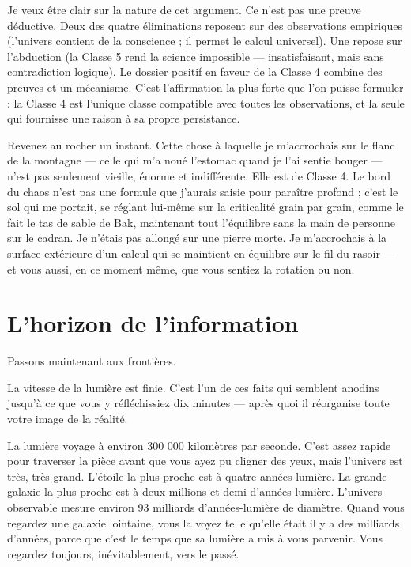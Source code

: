 \documentclass[11pt, twoside, openright]{book}
\begin{document}
Je veux être clair sur la nature de cet argument. Ce n'est pas une preuve déductive. Deux des quatre éliminations reposent sur des observations empiriques (l'univers contient de la conscience ; il permet le calcul universel). Une repose sur l'abduction (la Classe 5 rend la science impossible --- insatisfaisant, mais sans contradiction logique). Le dossier positif en faveur de la Classe 4 combine des preuves et un mécanisme. C'est l'affirmation la plus forte que l'on puisse formuler : la Classe 4 est l'unique classe compatible avec toutes les observations, et la seule qui fournisse une raison à sa propre persistance.

Revenez au rocher un instant. Cette chose à laquelle je m'accrochais sur le flanc de la montagne --- celle qui m'a noué l'estomac quand je l'ai sentie bouger --- n'est pas seulement vieille, énorme et indifférente. Elle est de Classe 4. Le bord du chaos n'est pas une formule que j'aurais saisie pour paraître profond ; c'est le sol qui me portait, se réglant lui-même sur la criticalité grain par grain, comme le fait le tas de sable de Bak, maintenant tout l'équilibre sans la main de personne sur le cadran. Je n'étais pas allongé sur une pierre morte. Je m'accrochais à la surface extérieure d'un calcul qui se maintient en équilibre sur le fil du rasoir --- et vous aussi, en ce moment même, que vous sentiez la rotation ou non.


\section*{L'horizon de l'information}

Passons maintenant aux frontières.

La vitesse de la lumière est finie. C'est l'un de ces faits qui semblent anodins jusqu'à ce que vous y réfléchissiez dix minutes --- après quoi il réorganise toute votre image de la réalité.

La lumière voyage à environ 300 000 kilomètres par seconde. C'est assez rapide pour traverser la pièce avant que vous ayez pu cligner des yeux, mais l'univers est très, très grand. L'étoile la plus proche est à quatre années-lumière. La grande galaxie la plus proche est à deux millions et demi d'années-lumière. L'univers observable mesure environ 93 milliards d'années-lumière de diamètre. Quand vous regardez une galaxie lointaine, vous la voyez telle qu'elle était il y a des milliards d'années, parce que c'est le temps que sa lumière a mis à vous parvenir. Vous regardez toujours, inévitablement, vers le passé.
\end{document}
